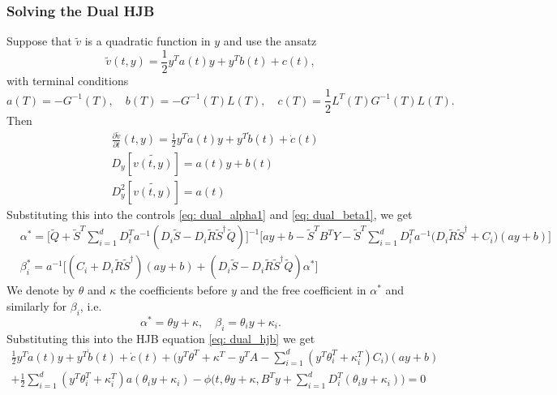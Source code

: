 \subsubsection{Solving the Dual HJB}
Suppose that $\tilde{v}$ is a quadratic function in $y$ and use the ansatz
\begin{equation}
    \tilde{v}(t,y) = \frac12 y^T a(t) y + y^T b(t) + c(t),
\end{equation}
with terminal conditions
\begin{equation}
    a(T) = -G^{-1}(T), \quad b(T) = - G^{-1}(T)L(T), \quad c(T) = \frac12 L^T(T)G^{-1}(T)L(T). \label{eq: dual_terminal_conditions}
\end{equation}
Then
\begin{align*}
    &\frac{\partial \tilde{v}}{\partial t}(t, y) = \frac12 y^T \dot{a}(t) y + y^T \dot{b}(t) + \dot{c}(t)\\
    &D_y[\tilde{v(t,y)}] = a(t) y + b(t)\\
    &D_y^2[\tilde{v(t,y)}] = a(t)
\end{align*}
Substituting this into the controls \eqref{eq: dual_alpha1} and \eqref{eq: dual_beta1}, we get
\begin{align}
    &\alpha^\ast = \bigg[\tilde{Q} + \tilde{S}^T \sum_{i=1}^d D_i^T a^{-1} (D_i \tilde{S} - D_i\tilde{R}\tilde{S}^\dagger \tilde{Q}) \bigg]^{-1} \bigg[ay+b - \tilde{S}^T B^T Y -\tilde{S}^T \sum_{i=1}^d D_i^T a^{-1} \big(D_i \tilde{R}\tilde{S}^\dagger + C_i\big) (ay+b)\bigg]\\
    &\beta_i^\ast = a^{-1} \bigg[ (C_i + D_i \tilde{R}\tilde{S}^\dagger) (ay+b)+ (D_i \tilde{S} - D_i \tilde{R}\tilde{S}^\dagger \tilde{Q})\alpha^\ast \bigg]
\end{align}
We denote by $\theta$ and $\kappa$ the coefficients before $y$ and the free coefficient in $\alpha^\ast$ and similarly for $\beta_i$, i.e. 
\begin{equation}
    \alpha^\ast = \theta y + \kappa, \quad \beta_i = \theta_i y + \kappa_i. \label{eq: dual_coeffs}
\end{equation}
Substituting this into the HJB equation \eqref{eq: dual_hjb} we get 
\begin{align}
     \frac12 y^T \dot{a}(t) y + y^T \dot{b}(t) + \dot{c}(t) + \bigg(y^T \theta^T + \kappa^T - y^T A - \sum_{i=1}^d (y^T \theta_i^T + \kappa_i^T) C_i\bigg)(ay+b)\\
     + \frac12 \sum_{i=1}^d (y^T\theta_i^T + \kappa_i^T) a (\theta_i y + \kappa_i) - \phi\bigg(t, \theta y + \kappa, B^T y + \sum_{i=1}^d D_i^T (\theta_i y + \kappa_i) \bigg) = 0
\end{align}
